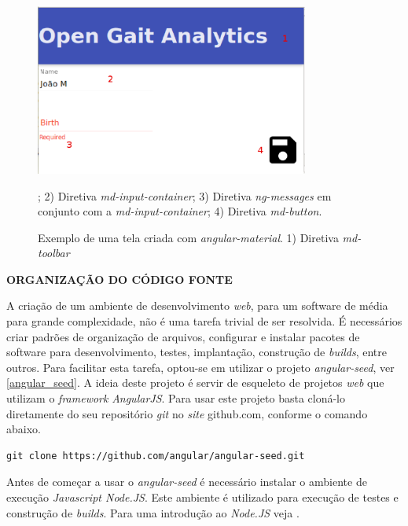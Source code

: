 \begin{figure}[ht]
	\centering
	\includegraphics[width=9cm]{figuras/material_amostra.eps}
	\caption[Exemplo de uma tela criada com \emph{angular-material}.]{Exemplo de uma tela criada com \emph{angular-material}. 1) Diretiva \emph{md-toolbar}}; 2) Diretiva \emph{md-input-container}; 3) Diretiva \emph{ng-messages} em conjunto com a \emph{md-input-container}; 4) Diretiva \emph{md-button}.
	\label{material_amostra}
\end{figure}

\textbf{ORGANIZAÇÃO DO CÓDIGO FONTE}

A criação de um ambiente de desenvolvimento \emph{web}, para um software de média para grande complexidade, não é uma tarefa trivial de ser resolvida.
É necessários criar padrões de organização de arquivos, configurar e instalar pacotes de software para desenvolvimento, testes, implantação, construção de \emph{builds}, entre outros.
Para facilitar esta tarefa, optou-se em utilizar o projeto \emph{angular-seed}, ver \ref{angular_seed}.
A ideia deste projeto é servir de esqueleto de projetos \emph{web} que utilizam o \emph{framework} \emph{AngularJS}.
Para usar este projeto basta cloná-lo diretamente do seu repositório \emph{git} no \emph{site} github.com, conforme o comando abaixo.
\lstset{language=bash}
\begin{lstlisting}[frame=single]
git clone https://github.com/angular/angular-seed.git
\end{lstlisting}

Antes de começar a usar o \emph{angular-seed} é necessário instalar o ambiente de execução \emph{Javascript Node.JS}. 
Este ambiente é utilizado para execução de testes e construção de \emph{builds}. Para uma introdução ao \emph{Node.JS} veja .
